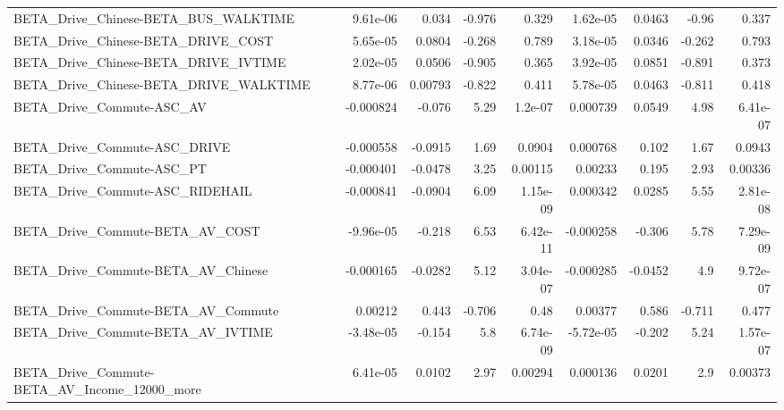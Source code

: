 \begin{tabular}{lrrrrrrrr}
BETA\_Drive\_Chinese-BETA\_BUS\_WALKTIME               &    9.61e-06 &        0.034 &    -0.976 &    0.329 &   1.62e-05 &      0.0463 &        -0.96 &         0.337 \\
BETA\_Drive\_Chinese-BETA\_DRIVE\_COST                 &    5.65e-05 &       0.0804 &    -0.268 &    0.789 &   3.18e-05 &      0.0346 &       -0.262 &         0.793 \\
BETA\_Drive\_Chinese-BETA\_DRIVE\_IVTIME               &    2.02e-05 &       0.0506 &    -0.905 &    0.365 &   3.92e-05 &      0.0851 &       -0.891 &         0.373 \\
BETA\_Drive\_Chinese-BETA\_DRIVE\_WALKTIME             &    8.77e-06 &      0.00793 &    -0.822 &    0.411 &   5.78e-05 &      0.0463 &       -0.811 &         0.418 \\
BETA\_Drive\_Commute-ASC\_AV                          &   -0.000824 &       -0.076 &      5.29 &  1.2e-07 &   0.000739 &      0.0549 &         4.98 &      6.41e-07 \\
BETA\_Drive\_Commute-ASC\_DRIVE                       &   -0.000558 &      -0.0915 &      1.69 &   0.0904 &   0.000768 &       0.102 &         1.67 &        0.0943 \\
BETA\_Drive\_Commute-ASC\_PT                          &   -0.000401 &      -0.0478 &      3.25 &  0.00115 &    0.00233 &       0.195 &         2.93 &       0.00336 \\
BETA\_Drive\_Commute-ASC\_RIDEHAIL                    &   -0.000841 &      -0.0904 &      6.09 & 1.15e-09 &   0.000342 &      0.0285 &         5.55 &      2.81e-08 \\
BETA\_Drive\_Commute-BETA\_AV\_COST                    &   -9.96e-05 &       -0.218 &      6.53 & 6.42e-11 &  -0.000258 &      -0.306 &         5.78 &      7.29e-09 \\
BETA\_Drive\_Commute-BETA\_AV\_Chinese                 &   -0.000165 &      -0.0282 &      5.12 & 3.04e-07 &  -0.000285 &     -0.0452 &          4.9 &      9.72e-07 \\
BETA\_Drive\_Commute-BETA\_AV\_Commute                 &     0.00212 &        0.443 &    -0.706 &     0.48 &    0.00377 &       0.586 &       -0.711 &         0.477 \\
BETA\_Drive\_Commute-BETA\_AV\_IVTIME                  &   -3.48e-05 &       -0.154 &       5.8 & 6.74e-09 &  -5.72e-05 &      -0.202 &         5.24 &      1.57e-07 \\
BETA\_Drive\_Commute-BETA\_AV\_Income\_12000\_more       &    6.41e-05 &       0.0102 &      2.97 &  0.00294 &   0.000136 &      0.0201 &          2.9 &       0.00373 \\

\end{tabular}
